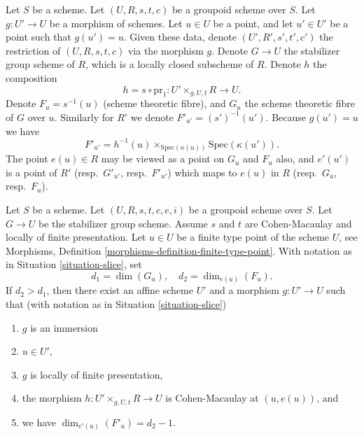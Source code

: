 \begin{situation}
\label{situation-slice}
Let $S$ be a scheme.
Let $(U, R, s, t, c)$ be a groupoid scheme over $S$.
Let $g : U' \to U$ be a morphism of schemes.
Let $u \in U$ be a point, and let $u' \in U'$ be a point such that
$g(u') = u$. Given these data, denote $(U', R', s', t', c')$
the restriction of $(U, R, s, t, c)$ via the morphism $g$.
Denote $G \to U$ the stabilizer group scheme of $R$, which
is a locally closed subscheme of $R$.
Denote $h$ the composition
$$
h = s \circ \text{pr}_1 : U' \times_{g, U, t} R \longrightarrow U.
$$
Denote $F_u = s^{-1}(u)$ (scheme theoretic fibre), and $G_u$ the
scheme theoretic fibre of $G$ over $u$.
Similarly for $R'$ we denote $F'_{u'} = (s')^{-1}(u')$.
Because $g(u') = u$ we have
$$
F'_{u'} = h^{-1}(u) \times_{\text{Spec}(\kappa(u))} \text{Spec}(\kappa(u')).
$$
The point $e(u) \in R$ may be viewed as a point on $G_u$ and $F_u$ also, and
$e'(u')$ is a point of $R'$ (resp.\ $G'_{u'}$, resp.\ $F'_{u'}$) which maps
to $e(u)$ in $R$ (resp.\ $G_u$, resp.\ $F_u$).
\end{situation}

\begin{lemma}
\label{lemma-slice}
Let $S$ be a scheme.
Let $(U, R, s, t, c, e, i)$ be a groupoid scheme over $S$.
Let $G \to U$ be the stabilizer group scheme.
Assume $s$ and $t$ are Cohen-Macaulay and locally of finite presentation.
Let $u \in U$ be a finite type point of the scheme $U$, see
Morphisms, Definition \ref{morphisms-definition-finite-type-point}.
With notation as in
Situation \ref{situation-slice},
set
$$
d_1 = \dim(G_u),\quad
d_2 = \dim_{e(u)}(F_u).
$$
If $d_2 > d_1$, then there exist an affine scheme $U'$
and a morphism $g : U' \to U$ such that (with notation as in
Situation \ref{situation-slice})
\begin{enumerate}
\item $g$ is an immersion
\item $u \in U'$,
\item $g$ is locally of finite presentation,
\item the morphism $h : U' \times_{g, U, t} R \longrightarrow U$
is Cohen-Macaulay at $(u, e(u))$, and
\item we have $\dim_{e'(u)}(F'_u) = d_2 - 1$.
\end{enumerate}
\end{lemma}

